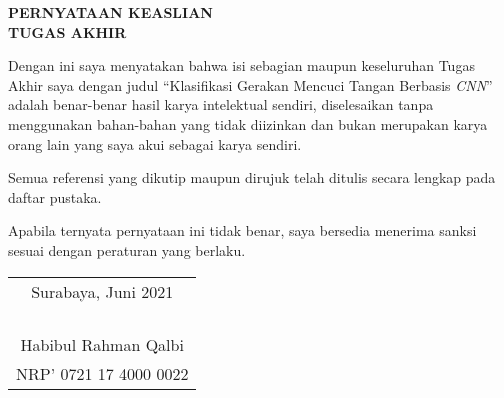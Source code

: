 \begin{center}
  \large
  \textbf{PERNYATAAN KEASLIAN\\TUGAS AKHIR}
\end{center}

\thispagestyle{empty}

\vspace{2ex}


Dengan ini saya menyatakan bahwa isi sebagian maupun keseluruhan Tugas Akhir saya dengan judul “Klasifikasi Gerakan Mencuci Tangan Berbasis \emph{CNN}” adalah benar-benar hasil karya intelektual sendiri, diselesaikan tanpa menggunakan bahan-bahan yang tidak diizinkan dan bukan merupakan karya orang lain yang saya akui sebagai karya sendiri. 

Semua referensi yang dikutip maupun dirujuk telah ditulis secara lengkap pada daftar pustaka. 

Apabila ternyata pernyataan ini tidak benar, saya bersedia menerima sanksi sesuai dengan peraturan yang berlaku. 

\vspace{4ex}

\begin{flushright}
  \begin{tabular}[b]{c}
    Surabaya, Juni 2021\\
    \\
    \\
    \\
    \\
	Habibul Rahman Qalbi \\
	NRP' 0721 17 4000 0022
  \end{tabular}
\end{flushright}
